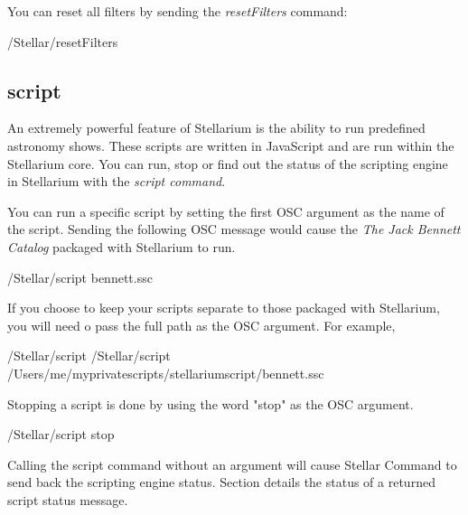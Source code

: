 You can reset all filters by sending the \textit{resetFilters} command: 
	\medskip
\begin{syntax}	
	\medskip
	/Stellar/resetFilters
	\medskip
\end{syntax}  
	\medskip
\subsection{script}\label{sec:scriptcommand}  
An extremely powerful feature of Stellarium is the ability to run predefined astronomy shows. These scripts are written in JavaScript and are run within the Stellarium core. You can run, stop or find out the status of the scripting engine in Stellarium with the \textit{script command}.

You can run a specific script by setting the first OSC argument as the name of the script. Sending the following OSC message would cause the \textit{The Jack Bennett Catalog} packaged with Stellarium to run.
\begin{syntax}	
	\medskip
	/Stellar/script bennett.ssc
	\medskip
\end{syntax}  
	\medskip
	
If you choose to keep your scripts separate to those packaged with Stellarium, you will need o pass the full path as the OSC argument. For example, 
	\medskip
\begin{syntax}	
	\medskip
	/Stellar/script /Stellar/script /Users/me/myprivatescripts/stellariumscript/bennett.ssc
	\medskip
\end{syntax}  
	\medskip
Stopping a script is done by using the word "stop" as the OSC argument. 
	\medskip
\begin{syntax}	
	\medskip
	/Stellar/script stop
	\medskip
\end{syntax}  
	\medskip
Calling the script command without an argument will cause Stellar Command to send back the scripting engine status. Section  details the status of a returned script status message.